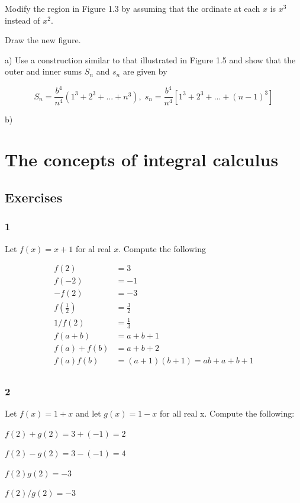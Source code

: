 \documentclass{report}
\begin{document}
Modify the region in Figure 1.3 by assuming that the ordinate at each $x$ is $x^3$ instead of $x^2$.

Draw the new figure.

a) Use a construction similar to that illustrated in Figure 1.5 and show that the outer and inner sums $S_n$ and $s_n$ are given by

\[
S_n = \frac{b^4}{n^4} (1^3 + 2^3 + ... + n^3), \; s_n = \frac{b^4}{n^4}[1^3 + 2^3 + ... + (n - 1)^3]
\]


b)

\setcounter{chapter}{0}
\chapter{The concepts of integral calculus}

\setcounter{section}{4}
\section{Exercises}

\subsection{1}

Let $f(x) = x + 1$ for al real $x$. Compute the following

\begin{align*}
f(2) &= 3\\
f(-2) &= -1\\
-f(2) &= -3\\
f(\frac{1}{2}) &= \frac{3}{2}\\
1/f(2) &= \frac{1}{3}\\
f(a + b) &= a + b + 1\\
f(a) + f(b) &= a + b + 2\\
f(a)f(b) &= (a+1)(b+1) = ab + a + b + 1\\
\end{align*}

\subsection{2}

Let $f(x) = 1 + x$ and let $g(x) = 1 - x$ for all real x. Compute the following:

$f(2) + g(2) = 3 + (-1) = 2$

$f(2) - g(2) = 3 - (-1) = 4$

$f(2)g(2) = -3$

$f(2)/g(2) = -3$
\end{document}
